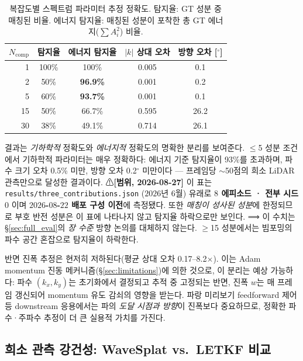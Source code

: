 \documentclass[11pt]{report}
\numberwithin{equation}{chapter}
\numberwithin{figure}{chapter}
\numberwithin{table}{chapter}
\begin{document}
\begin{table}[htbp]
\centering
\caption{복잡도별 스펙트럼 파라미터 추정 정확도. 탐지율: GT 성분 중 매칭된 비율.
에너지 탐지율: 매칭된 성분이 포착한 총 GT 에너지($\sum A_i^2$) 비율.}
\label{tab:spectral_accuracy}
\begin{tabular}{rcccc}
\toprule
$N_{\text{comp}}$ & 탐지율 & 에너지 탐지율 & $|k|$ 상대 오차 & 방향 오차 [$^\circ$] \\
\midrule
1  & 100\% & 100\%  & 0.005 & 0.1 \\
2  &  50\% & \textbf{96.9\%} & 0.001 & 0.2 \\
5  &  60\% & \textbf{93.7\%} & 0.001 & 0.1 \\
15 &  50\% &  66.7\%         & 0.595 & 26.2 \\
30 &  38\% &  49.1\%         & 0.714 & 26.1 \\
\bottomrule
\end{tabular}
\end{table}

결과는 \emph{기하학적} 정확도와 \emph{에너지적} 정확도의 명확한 분리를 보여준다.
$\leq$5 성분 조건에서 기하학적 파라미터는 매우 정확하다:
에너지 기준 탐지율이 93\%를 초과하며, 파수 크기 오차 0.5\% 미만,
방향 오차 0.2$^\circ$ 미만이다 --- 프레임당 $\sim$50점의 희소 LiDAR
관측만으로 달성한 결과이다.
⚠\textbf{[범위, 2026-08-27]} 이 표는 \texttt{results/three\_contributions.json}
($2026$년 $6$월) 유래로 \textbf{$8$ 에피소드 · 전부 시드 $0$} 이며
\textbf{$2026$-$08$-$22$ 배포 구성 이전}에 측정됐다. 또한 \emph{매칭이 성사된 성분}에
한정되므로 부호 반전 성분은 이 표에 나타나지 않고 탐지율 하락으로만 보인다.
⟹ 이 수치는 \S\ref{sec:full_eval}의 \emph{장 수준} 방향 논의를 대체하지 않는다.
$\geq$15 성분에서는 빔포밍의 파수 공간 혼잡으로 탐지율이 하락한다.

반면 진폭 추정은 현저히 저하된다(평균 상대 오차 0.17--8.2$\times$).
이는 Adam momentum 진동 메커니즘(§\ref{sec:limitations})에 의한
것으로, 이 분리는 예상 가능하다: 파수 $(k_x, k_y)$는 초기화에서 결정되고
추적 중 고정되는 반면, 진폭 $w$는 매 프레임 갱신되어
momentum 유도 감쇠의 영향을 받는다.
파랑 미리보기 feedforward 제어 등 downstream 응용에서는
파의 \emph{도달 시점과 방향}이 진폭보다 중요하므로,
정확한 파수·주파수 추정이 더 큰 실용적 가치를 가진다.

\subsection{희소 관측 강건성: WaveSplat vs.\ LETKF 비교}
\label{sec:sparse_comparison}
\end{document}
